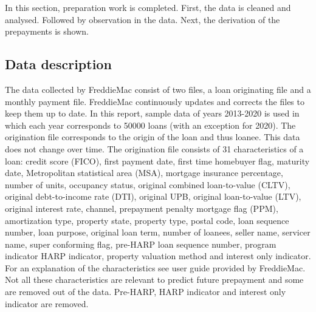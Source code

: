 In this section, preparation work is completed. First, the data is cleaned and analysed. Followed by observation in the data. Next, the derivation of the prepayments is shown.  

\subsection{Data description}
    The data collected by FreddieMac consist of two files, a loan originating file and a monthly payment file. FreddieMac continuously updates and corrects the files to keep them up to date. In this report, sample data of years 2013-2020 is used in which each year corresponds to 50000 loans (with an exception for 2020). The origination file corresponds to the origin of the loan and thus loanee. This data does not change over time. The origination file consists of 31 characteristics of a loan: credit score (FICO), first payment date, first time homebuyer flag, maturity date, Metropolitan statistical area (MSA), mortgage insurance percentage, number of units, occupancy status, original combined loan-to-value (CLTV), original debt-to-income rate (DTI), original UPB, original loan-to-value (LTV), original interest rate, channel, prepayment penalty mortgage flag (PPM), amortization type, property state, property type, postal code, loan sequence number, loan purpose, original loan term, number of loanees, seller name, servicer name, super conforming flag, pre-HARP loan sequence number, program indicator HARP indicator, property valuation method and interest only indicator. For an explanation of the characteristics see user guide provided by FreddieMac. Not all these characteristics are relevant to predict future prepayment and some are removed out of the data. Pre-HARP, HARP indicator and interest only indicator are removed.
    \\\\
